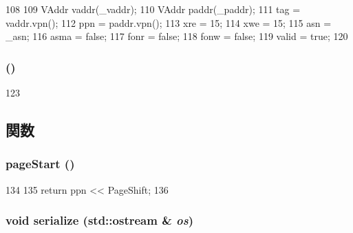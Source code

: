 \begin{DoxyCode}
108     {
109         VAddr vaddr(_vaddr);
110         VAddr paddr(_paddr);
111         tag = vaddr.vpn();
112         ppn = paddr.vpn();
113         xre = 15;
114         xwe = 15;
115         asn = _asn;
116         asma = false;
117         fonr = false;
118         fonw = false;
119         valid = true;
120     }
\end{DoxyCode}
\hypertarget{structAlphaISA_1_1TlbEntry_ad069716fb78ffaa2d9bfba679a8eac9a}{
\subsubsection[{TlbEntry}]{ ()}}
\label{structAlphaISA_1_1TlbEntry_ad069716fb78ffaa2d9bfba679a8eac9a}



\begin{DoxyCode}
123     {}
\end{DoxyCode}


\subsection{関数}
\hypertarget{structAlphaISA_1_1TlbEntry_a4f87fae41ff4bd27577a41dba3cf2b90}{
\subsubsection[{pageStart}]{ pageStart ()}}
\label{structAlphaISA_1_1TlbEntry_a4f87fae41ff4bd27577a41dba3cf2b90}



\begin{DoxyCode}
134     {
135         return ppn << PageShift;
136     }
\end{DoxyCode}
\hypertarget{structAlphaISA_1_1TlbEntry_a53e036786d17361be4c7320d39c99b84}{
\subsubsection[{serialize}]{\setlength{\rightskip}{0pt plus 5cm}void serialize (std::ostream \& {\em os})}}
\label{structAlphaISA_1_1TlbEntry_a53e036786d17361be4c7320d39c99b84}



